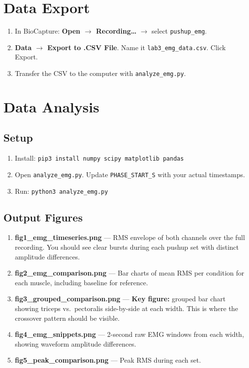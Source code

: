 \documentclass[11pt,letterpaper]{article}
\begin{document}
\section{Data Export}

\begin{enumerate}[nosep]
    \item In BioCapture: \textbf{Open $\rightarrow$ Recording\ldots} $\rightarrow$ select \texttt{pushup\_emg}.
    \item \textbf{Data $\rightarrow$ Export to .CSV File}.  Name it \texttt{lab3\_emg\_data.csv}.  Click Export.
    \item Transfer the CSV to the computer with \texttt{analyze\_emg.py}.
\end{enumerate}

\section{Data Analysis}

\subsection{Setup}
\begin{enumerate}[nosep]
    \item Install: \texttt{pip3 install numpy scipy matplotlib pandas}
    \item Open \texttt{analyze\_emg.py}.  Update \texttt{PHASE\_START\_S} with your actual timestamps.
    \item Run: \texttt{python3 analyze\_emg.py}
\end{enumerate}

\subsection{Output Figures}

\begin{enumerate}[nosep]
    \item \textbf{fig1\_emg\_timeseries.png} --- RMS envelope of both channels over the full recording.  You should see clear bursts during each pushup set with distinct amplitude differences.
    \item \textbf{fig2\_emg\_comparison.png} --- Bar charts of mean RMS per condition for each muscle, including baseline for reference.
    \item \textbf{fig3\_grouped\_comparison.png} --- \textbf{Key figure:} grouped bar chart showing triceps vs.\ pectoralis side-by-side at each width.  This is where the crossover pattern should be visible.
    \item \textbf{fig4\_emg\_snippets.png} --- 2-second raw EMG windows from each width, showing waveform amplitude differences.
    \item \textbf{fig5\_peak\_comparison.png} --- Peak RMS during each set.
\end{enumerate}
\end{document}
